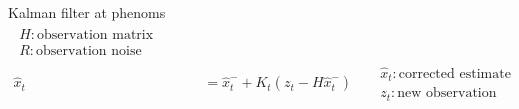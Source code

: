 \begin{frame}{Kalman filter at phenoms}
\[\begin{aligned}
\begin{array}{l}
                H: \text{observation matrix} \\
                R: \text{observation noise covariance}
            \end{array}
            \\[8pt]
            \hat{x}_{t}
            &=
            \hat{x}^{-}_{t}
            +
            K_{t}
            \left(
                z_{t}
                -
                H\hat{x}^{-}_{t}
            \right)
            &&
            \begin{array}{l}
                \hat{x}_{t}: \text{corrected estimate} \\
                z_{t}: \text{new observation}
            \end{array}
        \end{aligned}
    \]
\end{frame}